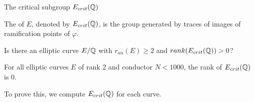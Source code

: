 \documentclass[handout]{beamer}
\begin{document}
\begin{frame}{The critical subgroup $E_{crit}(\mathbb{Q})$}
\begin{Def}
The  of $E$, denoted by $E_{crit}(\mathbb{Q})$, is the group generated by traces of 
images of ramification points of $\varphi$.  
\end{Def}

\pause


\begin{question}
Is there an elliptic curve $E/\mathbb{Q}$ with $r_{an}(E) \geq 2$ and $rank(E_{crit}(\mathbb{Q})) >0$?
\end{question}
\end{frame}


\begin{frame}

\begin{theorem}[C.]
For all elliptic curves $E$ of rank 2 and conductor $N <1000$, the rank of $E_{crit}(\mathbb{Q})$ is 0.
\end{theorem}

To prove this, we compute $E_{crit}(\mathbb{Q})$ for each curve. 


\end{frame}

\end{document}
